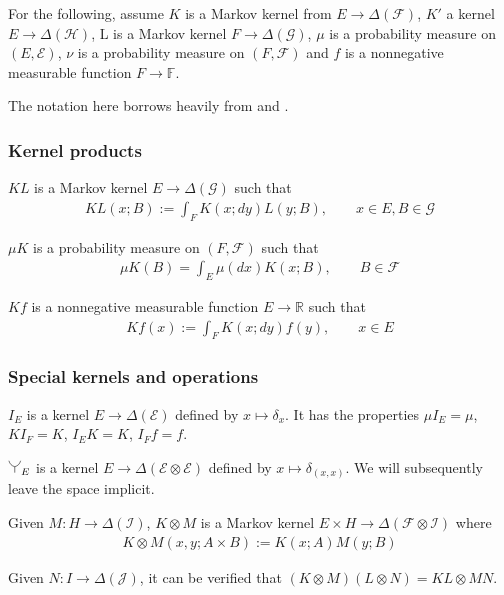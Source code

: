 For the following, assume $K$ is a Markov kernel from $E\to \Delta(\mathcal{F})$, $K'$ a kernel $E\to \Delta(\mathcal{H})$, L is a Markov kernel $F\to \Delta(\mathcal{G})$, $\mu$ is a probability measure on $(E,\mathcal{E})$, $\nu$ is a probability measure on $(F,\mathcal{F})$ and $f$ is a nonnegative measurable function $F\to \mathbb{F}$.

The notation here borrows heavily from \cite{cinlar_probability_2011} and \cite{fong_causal_2013}.

\subsubsection{Kernel products}

$KL$ is a Markov kernel $E\to \Delta(\mathcal{G})$ such that
\begin{align}
    KL(x;B):= \int_F K(x;dy) L(y;B),\qquad x\in E, B\in \mathcal{G}
\end{align}

$\mu K$ is a probability measure on $(F,\mathcal{F})$ such that
\begin{align}
    \mu K(B)=\int_E \mu(dx) K(x;B),\qquad B\in\mathcal{F}
\end{align}

$Kf$ is a nonnegative measurable function $E\to \mathbb{R}$ such that
\begin{align}
    Kf(x) := \int_F K(x;dy)f(y), \qquad x\in E
\end{align}

\subsubsection{Special kernels and operations}

$I_E$ is a kernel $E\to \Delta(\mathcal{E})$ defined by $x\mapsto \delta_x$. It has the properties $\mu I_E=\mu$, $KI_F = K$, $I_E K = K$, $I_F f=f$.

$\splitter{0.15}_E$ is a kernel $E\to \Delta(\mathcal{E}\otimes\mathcal{E})$ defined by $x\mapsto \delta_{(x,x)}$. We will subsequently leave the space implicit.

Given $M:H\to \Delta(\mathcal{I})$, $K\otimes M$ is a Markov kernel $E\times H\to \Delta(\mathcal{F}\otimes\mathcal{I})$ where
\begin{align}
    K\otimes M(x,y;A\times B) := K(x;A) M(y;B)
\end{align}

Given $N:I\to \Delta(\mathcal{J})$, it can be verified that $(K\otimes M)(L\otimes N)=KL\otimes MN$.

